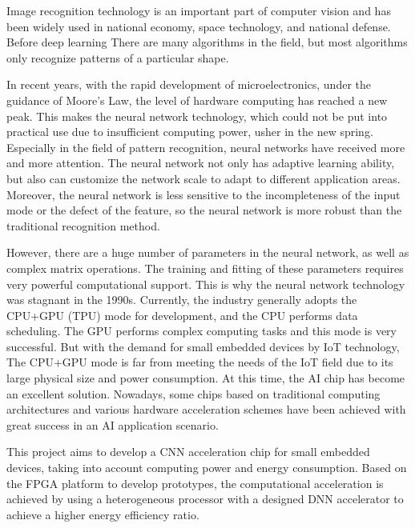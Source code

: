 \begin{enabstract}
  Image recognition technology is an important part of computer vision and has been widely used in national economy, space technology, and national defense. Before deep learning
  There are many algorithms in the field, but most algorithms only recognize patterns of a particular shape.

  In recent years, with the rapid development of microelectronics, under the guidance of Moore's Law, the level of hardware computing has reached a new peak.
  This makes the neural network technology, which could not be put into practical use due to insufficient computing power, usher in the new spring. Especially in the field of pattern recognition, neural networks have received more and more attention.
  The neural network not only has adaptive learning ability, but also can customize the network scale to adapt to different application areas.
  Moreover, the neural network is less sensitive to the incompleteness of the input mode or the defect of the feature, so the neural network is more robust than the traditional recognition method.

  However, there are a huge number of parameters in the neural network, as well as complex matrix operations. The training and fitting of these parameters requires very powerful computational support.
  This is why the neural network technology was stagnant in the 1990s. Currently, the industry generally adopts the CPU+GPU (TPU) mode for development, and the CPU performs data scheduling.
  The GPU performs complex computing tasks and this mode is very successful. But with the demand for small embedded devices by IoT technology,
  The CPU+GPU mode is far from meeting the needs of the IoT field due to its large physical size and power consumption. At this time, the AI chip has become an excellent solution.
  Nowadays, some chips based on traditional computing architectures and various hardware acceleration schemes have been achieved with great success in an AI application scenario.

  This project aims to develop a CNN acceleration chip for small embedded devices, taking into account computing power and energy consumption. Based on the FPGA platform to develop prototypes, the computational acceleration is achieved by using a heterogeneous processor with a designed DNN accelerator to achieve a higher energy efficiency ratio.

\end{enabstract}
